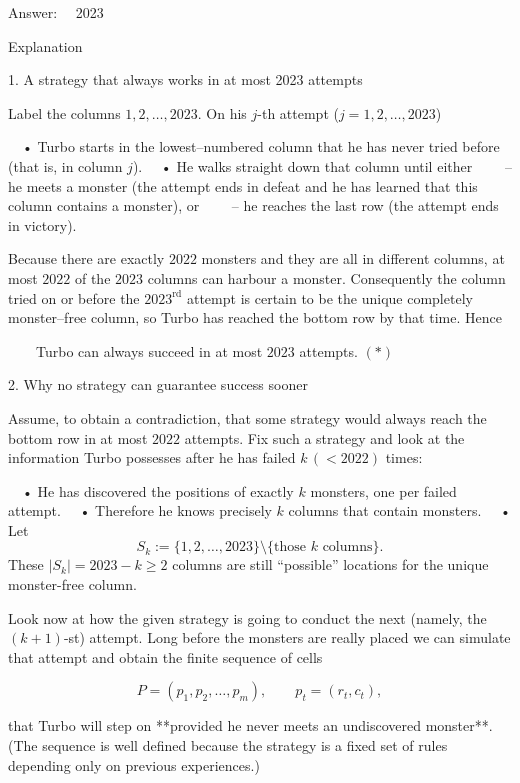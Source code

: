 Answer:  2023  

Explanation  

1.  A strategy that always works in at most 2023 attempts  

Label the columns \(1,2,\dots ,2023\).  
On his \(j\)-th attempt (\(j=1,2,\dots ,2023\))

 • Turbo starts in the lowest–numbered column that he has never tried before (that
  is, in column \(j\)).  
 • He walks straight down that column until either  
  – he meets a monster (the attempt ends in defeat and he has learned that this
     column contains a monster), or  
  – he reaches the last row (the attempt ends in victory).

Because there are exactly \(2022\) monsters and they are all in different
columns, at most \(2022\) of the \(2023\) columns can harbour a monster.
Consequently the column tried on or before the \(2023^{\text{rd}}\) attempt is
certain to be the unique completely monster–free column, so Turbo has reached
the bottom row by that time.  Hence

  Turbo can always succeed in at most \(2023\) attempts.       \((\ast )\)



2.  Why no strategy can guarantee success sooner  

Assume, to obtain a contradiction, that some strategy would always reach the
bottom row in at most \(2022\) attempts.  
Fix such a strategy and look at the information Turbo possesses after he has
failed \(k\,(<2022)\) times:

 • He has discovered the positions of exactly \(k\) monsters, one per failed
  attempt.  
 • Therefore he knows precisely \(k\) columns that contain monsters.  
 • Let
  \[
     S_k:=\{1,2,\dots ,2023\}\setminus\{\text{those }k\text{ columns}\}.
  \]
  These \(|S_k|=2023-k\ge 2\) columns are still “possible” locations for the
  unique monster-free column.

Look now at how the given strategy is going to conduct the next (namely, the
\((k+1)\)-st) attempt.  Long before the monsters are really placed we can
simulate that attempt and obtain the finite sequence of cells

\[
     P=(p_1,p_2,\dots ,p_m),\qquad p_t=(r_t,c_t),
\]

that Turbo will step on **provided he never meets an undiscovered
monster**.  (The sequence is well defined because the strategy is a fixed set
of rules depending only on previous experiences.)

